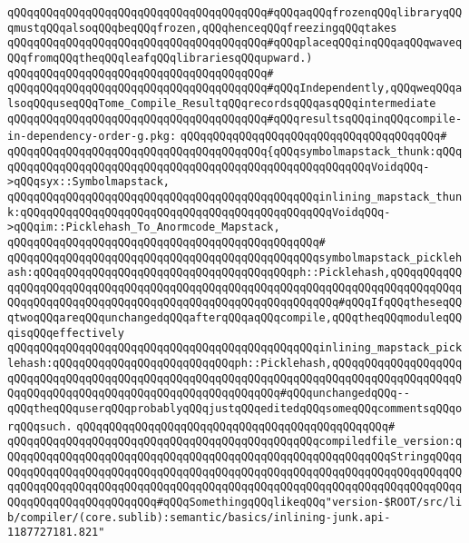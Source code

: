 \verb|qQQqqQQqqQQqqQQqqQQqqQQqqQQqqQQqqQQqqQQq#qQQqaqQQqfrozenqQQqlibraryqQQqmustqQQqalsoqQQqbeqQQqfrozen,qQQqhenceqQQqfreezingqQQqtakes|\newline
\verb|qQQqqQQqqQQqqQQqqQQqqQQqqQQqqQQqqQQqqQQq#qQQqplaceqQQqinqQQqaqQQqwaveqQQqfromqQQqtheqQQqleafqQQqlibrariesqQQqupward.)|\newline
\verb|qQQqqQQqqQQqqQQqqQQqqQQqqQQqqQQqqQQqqQQq#|\newline
\verb|qQQqqQQqqQQqqQQqqQQqqQQqqQQqqQQqqQQqqQQq#qQQqIndependently,qQQqweqQQqalsoqQQquseqQQqTome_Compile_ResultqQQqrecordsqQQqasqQQqintermediate|\newline
\verb|qQQqqQQqqQQqqQQqqQQqqQQqqQQqqQQqqQQqqQQq#qQQqresultsqQQqinqQQqcompile-in-dependency-order-g.pkg:|\newline
\verb|qQQqqQQqqQQqqQQqqQQqqQQqqQQqqQQqqQQqqQQq#|\newline
\verb|qQQqqQQqqQQqqQQqqQQqqQQqqQQqqQQqqQQqqQQq{qQQqsymbolmapstack_thunk:qQQqqQQqqQQqqQQqqQQqqQQqqQQqqQQqqQQqqQQqqQQqqQQqqQQqqQQqqQQqVoidqQQq->qQQqsyx::Symbolmapstack,|\newline
\verb|qQQqqQQqqQQqqQQqqQQqqQQqqQQqqQQqqQQqqQQqqQQqqQQqinlining_mapstack_thunk:qQQqqQQqqQQqqQQqqQQqqQQqqQQqqQQqqQQqqQQqqQQqqQQqVoidqQQq->qQQqim::Picklehash_To_Anormcode_Mapstack,|\newline
\verb|qQQqqQQqqQQqqQQqqQQqqQQqqQQqqQQqqQQqqQQqqQQqqQQq#|\newline
\verb|qQQqqQQqqQQqqQQqqQQqqQQqqQQqqQQqqQQqqQQqqQQqqQQqsymbolmapstack_picklehash:qQQqqQQqqQQqqQQqqQQqqQQqqQQqqQQqqQQqqQQqph::Picklehash,qQQqqQQqqQQqqQQqqQQqqQQqqQQqqQQqqQQqqQQqqQQqqQQqqQQqqQQqqQQqqQQqqQQqqQQqqQQqqQQqqQQqqQQqqQQqqQQqqQQqqQQqqQQqqQQqqQQqqQQqqQQqqQQqqQQq#qQQqIfqQQqtheseqQQqtwoqQQqareqQQqunchangedqQQqafterqQQqaqQQqcompile,qQQqtheqQQqmoduleqQQqisqQQqeffectively|\newline
\verb|qQQqqQQqqQQqqQQqqQQqqQQqqQQqqQQqqQQqqQQqqQQqqQQqinlining_mapstack_picklehash:qQQqqQQqqQQqqQQqqQQqqQQqqQQqph::Picklehash,qQQqqQQqqQQqqQQqqQQqqQQqqQQqqQQqqQQqqQQqqQQqqQQqqQQqqQQqqQQqqQQqqQQqqQQqqQQqqQQqqQQqqQQqqQQqqQQqqQQqqQQqqQQqqQQqqQQqqQQqqQQqqQQqqQQq#qQQqunchangedqQQq--qQQqtheqQQquserqQQqprobablyqQQqjustqQQqeditedqQQqsomeqQQqcommentsqQQqorqQQqsuch.|\newline
\verb|qQQqqQQqqQQqqQQqqQQqqQQqqQQqqQQqqQQqqQQqqQQqqQQq#|\newline
\verb|qQQqqQQqqQQqqQQqqQQqqQQqqQQqqQQqqQQqqQQqqQQqqQQqcompiledfile_version:qQQqqQQqqQQqqQQqqQQqqQQqqQQqqQQqqQQqqQQqqQQqqQQqqQQqqQQqqQQqStringqQQqqQQqqQQqqQQqqQQqqQQqqQQqqQQqqQQqqQQqqQQqqQQqqQQqqQQqqQQqqQQqqQQqqQQqqQQqqQQqqQQqqQQqqQQqqQQqqQQqqQQqqQQqqQQqqQQqqQQqqQQqqQQqqQQqqQQqqQQqqQQqqQQqqQQqqQQqqQQqqQQqqQQq#qQQqSomethingqQQqlikeqQQq"version-$ROOT/src/lib/compiler/(core.sublib):semantic/basics/inlining-junk.api-1187727181.821"|\newline
